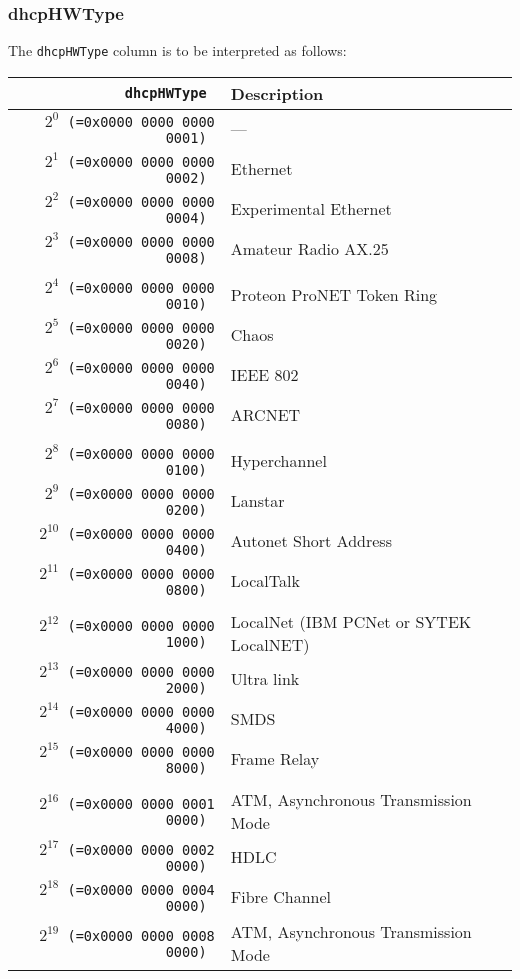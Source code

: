 \documentclass[documentation]{subfiles}
\begin{document}
\subsubsection{dhcpHWType}\label{dhcpHWType}
The {\tt dhcpHWType} column is to be interpreted as follows:
\begin{longtable}{>{\tt}rl}
    \toprule
    {\bf dhcpHWType} & {\bf Description}\\
    \midrule\endhead%
    $2^{0}$  (=0x0000 0000 0000 0001) & --- \\
    $2^{1}$  (=0x0000 0000 0000 0002) & Ethernet \\
    $2^{2}$  (=0x0000 0000 0000 0004) & Experimental Ethernet \\
    $2^{3}$  (=0x0000 0000 0000 0008) & Amateur Radio AX.25 \\
    \\
    $2^{4}$  (=0x0000 0000 0000 0010) & Proteon ProNET Token Ring \\
    $2^{5}$  (=0x0000 0000 0000 0020) & Chaos \\
    $2^{6}$  (=0x0000 0000 0000 0040) & IEEE 802 \\
    $2^{7}$  (=0x0000 0000 0000 0080) & ARCNET \\
    \\
    $2^{8}$  (=0x0000 0000 0000 0100) & Hyperchannel \\
    $2^{9}$  (=0x0000 0000 0000 0200) & Lanstar \\
    $2^{10}$ (=0x0000 0000 0000 0400) & Autonet Short Address \\
    $2^{11}$ (=0x0000 0000 0000 0800) & LocalTalk \\
    \\
    $2^{12}$ (=0x0000 0000 0000 1000) & LocalNet (IBM PCNet or SYTEK LocalNET) \\
    $2^{13}$ (=0x0000 0000 0000 2000) & Ultra link \\
    $2^{14}$ (=0x0000 0000 0000 4000) & SMDS \\
    $2^{15}$ (=0x0000 0000 0000 8000) & Frame Relay \\
    \\
    $2^{16}$ (=0x0000 0000 0001 0000) & ATM, Asynchronous Transmission Mode \\
    $2^{17}$ (=0x0000 0000 0002 0000) & HDLC \\
    $2^{18}$ (=0x0000 0000 0004 0000) & Fibre Channel \\
    $2^{19}$ (=0x0000 0000 0008 0000) & ATM, Asynchronous Transmission Mode \\

\end{longtable}
\end{document}

